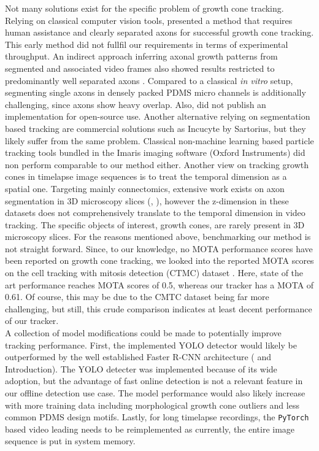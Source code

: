 Not many solutions exist for the specific problem of growth cone tracking.
Relying on classical computer vision tools, \cite{gc_tracking} presented a
method that requires human assistance and clearly separated axons for successful
growth cone tracking. This early method did not fullfil our requirements in
terms of experimental throughput. An indirect approach inferring axonal growth
patterns from segmented and associated video frames also showed results
restricted to predominantly well separated axons \parencite{seg_track}. Compared
to a classical \textit{in vitro} setup, segmenting single axons in densely
packed PDMS micro channels is additionally challenging, since axons show heavy
overlap. Also, \cite{seg_track} did not publish an implementation for
open-source use. Another alternative relying on segmentation based tracking are
commercial solutions such as Incucyte by Sartorius, but they likely suffer from
the same problem. Classical non-machine learning based particle tracking tools
bundled in the Imaris imaging software (Oxford Instruments) did non perform
comparable to our method either. Another view on tracking growth cones in
timelapse image sequences is to treat the temporal dimension as a spatial one.
Targeting mainly connectomics, extensive work exists on axon segmentation in 3D
microscopy slices (\cite{3D_seg_1}, \cite{3D_seg_2}), however the z-dimension in
these datasets does not comprehensively translate to the temporal dimension in
video tracking. The specific objects of interest, growth cones, are rarely
present in 3D microscopy slices. For the reasons mentioned above, benchmarking
our method is not straight forward. Since, to our knowledge, no MOTA performance
scores have been reported on growth cone tracking, we looked into the reported
MOTA scores on the cell tracking with mitosis detection (CTMC) dataset
\parencite{organelltracking}. Here, state of the art performance reaches MOTA
scores of 0.5, whereas our tracker has a MOTA of 0.61. Of course, this may be
due to the CMTC dataset being far more challenging, but still, this crude
comparison indicates at least decent performance of our tracker. \\

A collection of model modifications could be made to potentially improve
tracking performance. First, the implemented YOLO detector would likely be
outperformed by the well established Faster R-CNN architecture
(\cite{fasterrcnn} and Introduction). The YOLO detecter was implemented because
of its wide adoption, but the advantage of fast online detection is not a
relevant feature in our offline detection use case. The model performance would
also likely increase with more training data including morphological growth cone
outliers and less common PDMS design motifs. Lastly, for long timelapse
recordings, the \verb|PyTorch| based video leading needs to be reimplemented as
currently, the entire image sequence is put in system memory.

